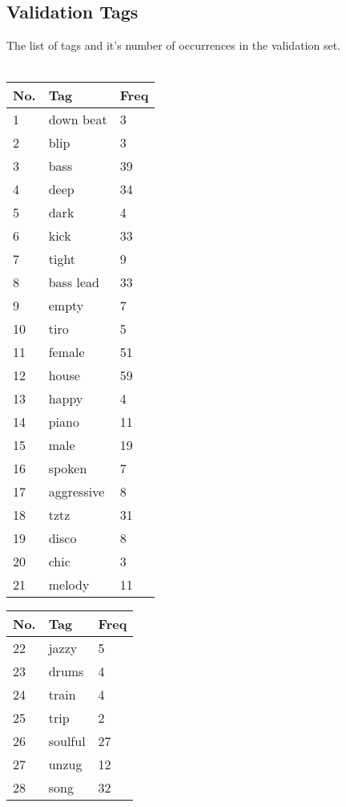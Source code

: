 \begin{appendices}
\section{Validation Tags}
\label{validationtags}
The list of tags and it's number of occurrences in the validation set.\\
\\
\begin{tabular}{| p{} | p{} | p{}|}
\hline
\textbf{No.} & \textbf{Tag} & \textbf{Freq}\\
\hline
1 & down beat & 3\\
\hline
2 & blip & 3 \\
\hline
3 & bass & 39 \\
\hline
4 & deep & 34 \\
\hline
5 & dark & 4\\
\hline
6 & kick & 33\\
\hline
7 & tight & 9\\
\hline
8 & bass lead & 33\\
\hline
9 & empty & 7\\
\hline
10 & tiro & 5\\
\hline
11 & female & 51\\
\hline
12 & house & 59\\
\hline
13 & happy & 4\\
\hline
14 & piano & 11\\
\hline
15 & male & 19\\
\hline
16 & spoken & 7 \\
\hline
17 & aggressive & 8\\
\hline
18 & tztz & 31\\
\hline
19 & disco & 8\\
\hline
20 & chic & 3\\
\hline
21 & melody & 11\\
\hline
\end{tabular}
\quad
\begin{tabular}{| p{} | p{} | p{}|}
\hline
\textbf{No.} & \textbf{Tag} & \textbf{Freq}\\
\hline
22 & jazzy & 5\\
\hline
23 & drums & 4\\
\hline
24 & train & 4\\
\hline
25 & trip & 2\\
\hline
26 & soulful & 27\\
\hline
27 & unzug & 12\\
\hline
28 & song & 32\\

\end{tabular}
\end{appendices}
